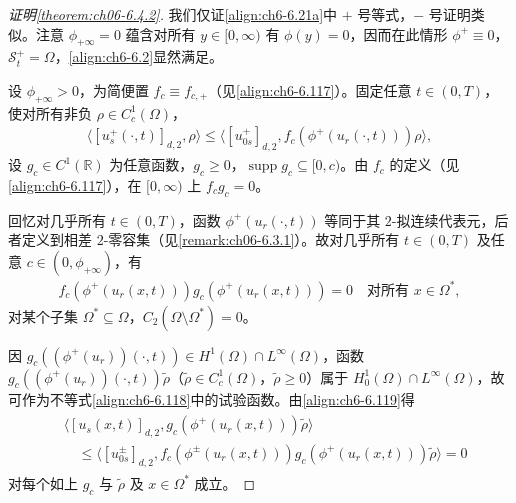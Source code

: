 \documentclass[../../main.tex]{subfiles}%
\begin{document}
\begin{proof}[证明\cref{theorem:ch06-6.4.2}]
我们仅证\eqref{align:ch6-6.21a}中 $+$ 号等式，$-$ 号证明类似。注意 $\phi_{+\infty}=0$ 蕴含对所有 $y\in[0,\infty)$ 有 $\phi(y)=0$，因而在此情形 $\phi^+\equiv0$，$\mathscr{S}^+_t=\Omega$，\eqref{align:ch6-6.2}显然满足。

设 $\phi_{+\infty}>0$，为简便置 $f_c\equiv f_{c,+}$（见\eqref{align:ch6-6.117}）。固定任意 $t\in(0,T)$，使对所有非负 $\rho\in C^1_c(\Omega)$，
\begin{align*}
\langle[u^+_s(\cdot,t)]_{d,2},\rho\rangle
\leqslant\langle[u^+_{0s}]_{d,2},f_c(\phi^+(u_r(\cdot,t)))\rho\rangle,
\end{align*}
设 $g_c\in C^1(\mathbb{R})$ 为任意函数，$g_c\geqslant0$，$\operatorname{supp}g_c\subseteq[0,c)$。由 $f_c$ 的定义（见\eqref{align:ch6-6.117}），在 $[0,\infty)$ 上 $f_c g_c=0$。

回忆对几乎所有 $t\in(0,T)$，函数 $\phi^+(u_r(\cdot,t))$ 等同于其 $2$-拟连续代表元，后者定义到相差 $2$-零容集（见\cref{remark:ch06-6.3.1}）。故对几乎所有 $t\in(0,T)$ 及任意 $c\in(0,\phi_{+\infty})$，有
\begin{align}
f_c(\phi^+(u_r(x,t)))g_c(\phi^+(u_r(x,t)))=0
\quad\text{对所有 }x\in\Omega^*, \label{align:ch6-6.119}
\end{align}
对某个子集 $\Omega^*\subseteq\Omega$，$C_2(\Omega\setminus\Omega^*)=0$。

因 $g_c((\phi^+(u_r))(\cdot,t))\in H^1(\Omega)\cap L^\infty(\Omega)$，函数 $g_c((\phi^+(u_r))(\cdot,t))\widetilde\rho$（$\widetilde\rho\in C^1_c(\Omega)$，$\widetilde\rho\geqslant0$）属于 $H^1_0(\Omega)\cap L^\infty(\Omega)$，故可作为不等式\eqref{align:ch6-6.118}中的试验函数。由\eqref{align:ch6-6.119}得
\begin{align}
\begin{aligned}
&\langle[u_s(x,t)]_{d,2},g_c(\phi^+(u_r(x,t)))\widetilde\rho\rangle\\
&\quad\leqslant\langle[u^\pm_{0s}]_{d,2},f_c(\phi^\pm(u_r(x,t)))g_c(\phi^+(u_r(x,t)))\widetilde\rho\rangle=0
\end{aligned} \label{align:ch6-6.120}
\end{align}
对每个如上 $g_c$ 与 $\widetilde\rho$ 及 $x\in\Omega^*$ 成立。


\end{proof}
\end{document}
